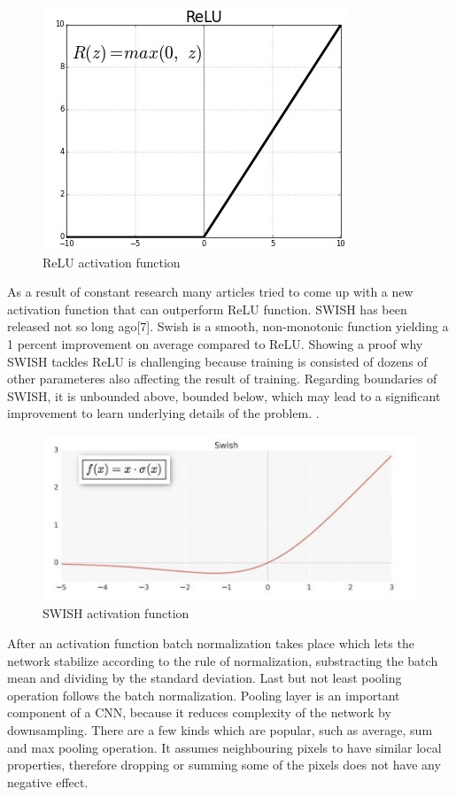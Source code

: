 \documentclass{article}
\begin{document}
\begin{figure}[!h]
	\includegraphics[scale = 0.55]{images/relu}
	\centering
	\caption{ReLU activation function}
\end{figure}

As a result of constant research many articles tried to come up with a new activation function that
can outperform ReLU function. SWISH has been released not so long ago[7]. Swish is a smooth, non-monotonic function yielding a 1 percent improvement on average compared to ReLU. Showing a proof why SWISH tackles ReLU is challenging because training is consisted of dozens of other parameteres also affecting the result of training. Regarding boundaries of SWISH, it is unbounded above, bounded below, which may lead to a significant improvement to learn underlying details of the problem.
.

\begin{figure}[!h]
	\includegraphics[scale = 0.65]{images/swish}
	\centering
	\caption{SWISH activation function}
\end{figure}

After an activation function batch normalization takes place which lets the network stabilize according to the rule of normalization, substracting the batch mean and dividing by the standard deviation. Last but not least pooling operation follows the batch normalization. Pooling layer is an important component of a CNN, because it reduces complexity of the network by downsampling. There are a few kinds which are popular, such as average, sum and max pooling operation. It assumes neighbouring pixels to have similar local properties, therefore dropping or summing some of the pixels does not have any negative effect.
\end{document}
